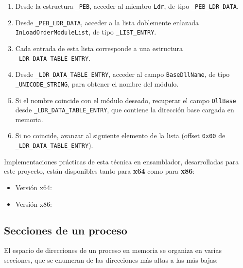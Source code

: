 \begin{enumerate}
    \item Desde la estructura \texttt{\_PEB}, acceder al miembro \texttt{Ldr}, de tipo \texttt{\_PEB\_LDR\_DATA}.
    \item Desde \texttt{\_PEB\_LDR\_DATA}, acceder a la lista doblemente enlazada \texttt{InLoadOrderModuleList}, de tipo \texttt{\_LIST\_ENTRY}.
    \item Cada entrada de esta lista corresponde a una estructura \texttt{\_LDR\_DATA\_TABLE\_ENTRY}.
    \item Desde \texttt{\_LDR\_DATA\_TABLE\_ENTRY}, acceder al campo \texttt{BaseDllName}, de tipo \texttt{\_UNICODE\_STRING}, para obtener el nombre del módulo.
    \item Si el nombre coincide con el módulo deseado, recuperar el campo \texttt{DllBase} desde \texttt{\_LDR\_DATA\_TABLE\_ENTRY}, que contiene la dirección base cargada en memoria.
    \item Si no coincide, avanzar al siguiente elemento de la lista (offset \texttt{0x00} de \texttt{\_LDR\_DATA\_TABLE\_ENTRY}).
\end{enumerate}

Implementaciones prácticas de esta técnica en ensamblador, desarrolladas para este proyecto, están disponibles tanto para \textbf{x64} como para \textbf{x86}:

\begin{itemize}
    \item Versión x64: \cite{nyascla_get_module_handle_x64}
    \item Versión x86: \cite{nyascla_get_module_handle_x86}
\end{itemize}

\subsection{Secciones de un proceso}

El espacio de direcciones de un proceso en memoria se organiza en varias secciones, que se enumeran de las direcciones más altas a las más bajas:

